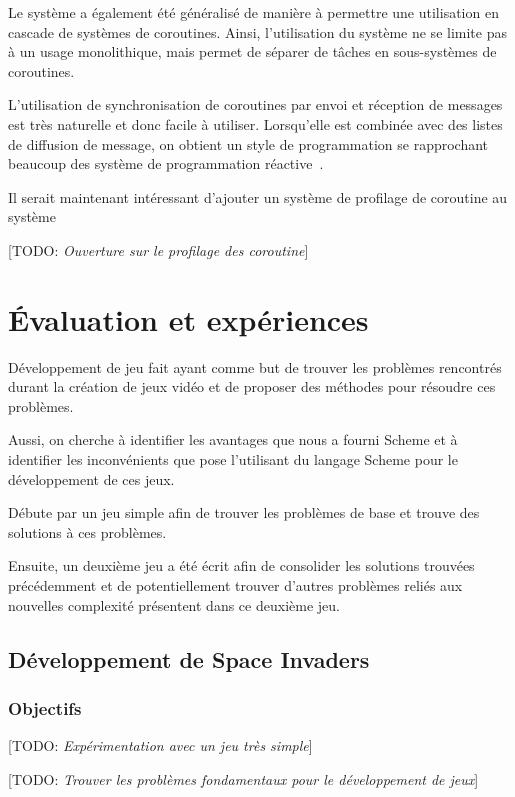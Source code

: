\documentclass[12pt,oneside,letterpaper,francais]{book}
\newcommand{\todo}[1]{[TODO: {\it #1}]}
\begin{document}
Le système a également été généralisé de manière à permettre une
utilisation en cascade de systèmes de coroutines. Ainsi, l'utilisation
du système ne se limite pas à un usage monolithique, mais permet de
séparer de tâches en sous-systèmes de coroutines.

L'utilisation de synchronisation de coroutines par envoi et réception
de messages est très naturelle et donc facile à utiliser. Lorsqu'elle
est combinée avec des listes de diffusion de message, on obtient un
style de programmation se rapprochant beaucoup des système de
programmation réactive~\cite{FRP}.

Il serait maintenant intéressant d'ajouter un système de profilage de
coroutine au système

\todo{Ouverture sur le profilage des coroutine}


\chapter{Évaluation et expériences}

Développement de jeu fait ayant comme but de trouver les problèmes
rencontrés durant la création de jeux vidéo et de proposer des
méthodes pour résoudre ces problèmes.

Aussi, on cherche à identifier les avantages que nous a fourni Scheme
et à identifier les inconvénients que pose l'utilisant du langage
Scheme pour le développement de ces jeux.

Débute par un jeu simple afin de trouver les problèmes de base et
trouve des solutions à ces problèmes.

Ensuite, un deuxième jeu a été écrit afin de consolider les solutions
trouvées précédemment et de potentiellement trouver d'autres problèmes
reliés aux nouvelles complexité présentent dans ce deuxième jeu.

\section{Développement de \og Space Invaders \fg}

\subsection{Objectifs}
\todo{Expérimentation avec un jeu très simple}

\todo{Trouver les problèmes fondamentaux pour le développement de jeux}
\end{document}
